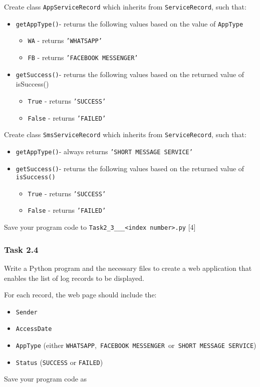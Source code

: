 Create class \texttt{AppServiceRecord} which inherits from \texttt{ServiceRecord},
such that: 
\begin{itemize}
\item \texttt{getAppType()}- returns the following values based on the value
of \texttt{AppType} 
\begin{itemize}
\item \texttt{WA} - returns \texttt{'WHATSAPP'} 
\item \texttt{FB} - returns \texttt{'FACEBOOK MESSENGER' }
\end{itemize}
\item \texttt{getSuccess()}- returns the following values based on the returned
value of isSuccess() 
\begin{itemize}
\item \texttt{True} - returns \texttt{'SUCCESS'} 
\item \texttt{False} - returns \texttt{'FAILED'} 
\end{itemize}
\end{itemize}
Create class \texttt{SmsServiceRecord} which inherits from \texttt{ServiceRecord},
such that: 
\begin{itemize}
\item \texttt{getAppType()}- always returns \texttt{'SHORT MESSAGE SERVICE' }
\item \texttt{getSuccess()}- returns the following values based on the returned
value of \texttt{isSuccess() }
\begin{itemize}
\item \texttt{True} - returns \texttt{'SUCCESS'} 
\item \texttt{False} - returns \texttt{'FAILED'} 
\end{itemize}
\end{itemize}
Save your program code to \texttt{Task2\_3\_<your name>\_<center number>\_<index
number>.py}\hfill{} {[}4{]}

\subsubsection*{Task 2.4 }

Write a Python program and the necessary files to create a web application
that enables the list of log records to be displayed. 

For each record, the web page should include the: 
\begin{itemize}
\item \texttt{Sender }
\item \texttt{AccessDate }
\item \texttt{AppType} (either \texttt{WHATSAPP},\texttt{ FACEBOOK MESSENGER
}or\texttt{ SHORT MESSAGE SERVICE}) 
\item \texttt{Status} (\texttt{SUCCESS} or \texttt{FAILED}) 
\end{itemize}
Save your program code as 


